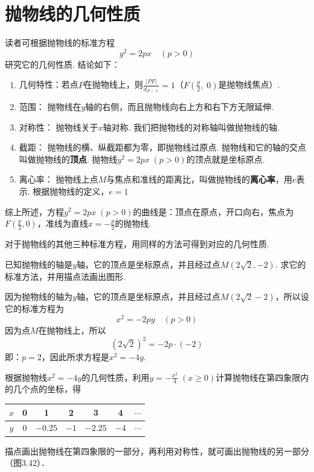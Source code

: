 \section{抛物线的几何性质}
读者可根据抛物线的标准方程
\begin{equation}
    y^2=2px\quad (p>0) \tag{1}
\end{equation}
研究它的几何性质. 结论如下：

\begin{enumerate}
    \item 几何特性：若点$P$在抛物线上，则$\frac{|PF|}{d_{P-\ell}}=1$（$F\left(\frac{p}{2},\; 0\right)$是抛物线焦点）.
    \item 范围：
    抛物线在$y$轴的右侧，而且抛物线向右上方和右下方无限延伸.
    \item 对称性：
    抛物线关于$x$轴对称. 我们把抛物线的对称轴叫做抛物线的轴.
    \item 截距：
    抛物线的横、纵截距都为零，即抛物线过原点. 抛物线和它的轴的交点叫做抛物线的\textbf{顶点}. 抛物线$y^2=2px\; (p>0)$的顶点就是坐标原点.
    \item 离心率：
    抛物线上点$M$与焦点和准线的距离比，叫做抛物线的\textbf{离心率}，用$e$表示. 根据抛物线的定义，$e=1$
\end{enumerate}

    综上所述，方程$y^2=2px\; (p>0)$的曲线是：顶点在原点，开口向右，焦点为$F\left(\frac{p}{2},0\right)$，准线为直线$x=-\frac{p}{2}$的抛物线.

    对于抛物线的其他三种标准方程，用同样的方法可得到对应的几何性质.

\begin{example}
    已知抛物线的轴是$y$轴，它的顶点是坐标原点，并且经过点$M(2\sqrt{2},-2)$. 求它的标准方法，并用描点法画出图形.
\end{example}

\begin{solution}
    因为抛物线的轴为$y$轴，它的顶点是坐标原点，并且经过点$M(2\sqrt{2}-2)$，所以设它的标准方程为  
\[x^2=-2py\quad (p>0)\]
因为点$M$在抛物线上，所以
\[\left(2\sqrt{2}\right)^2=-2p\cdot (-2)\]
即：$p=2$，因此所求方程是$x^2=-4y$.

根据抛物线$x^2=-4y$的几何性质，利用$y=-\frac{x^2}{4}\; (x\ge 0)$计算抛物线在第四象限内的几个点的坐标，得
\begin{center}
    \begin{tabular}{c|cccccc}
\hline
$x$ &0&1&2&3&4&$\cdots$\\
\hline
$y$&0&$-0.25$&$-1$&$-2.25$&$-4$&$\cdots$\\
\hline
    \end{tabular}
\end{center}

描点画出抛物线在第四象限的一部分，再利用对称性，就可画出抛物线的另一部分（图3.42）．
\end{solution}


